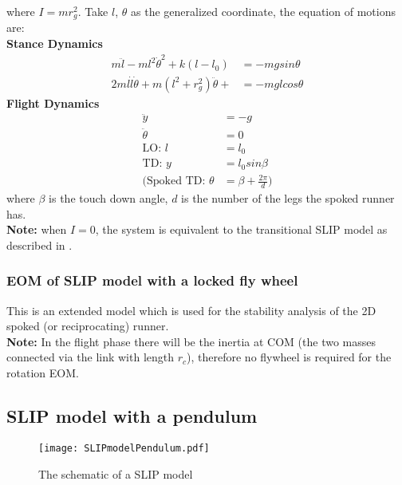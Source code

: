 \noindent
where $I = mr_g^2$. Take $l$, $\theta$ as the generalized coordinate, the equation of motions are:\\
\noindent
\textbf {Stance Dynamics}
\begin{align*}
m\ddot{l} - ml^2\dot{\theta}^2 + k(l-l_0) &= -mgsin\theta\\
2ml\dot l \dot{\theta} + m(l^2+r_g^2)\ddot{\theta} +   &= -mglcos\theta
\end{align*}
\noindent
\textbf {Flight Dynamics}
\begin{align*}
\ddot y &= -g\\
\ddot \theta &= 0\\
\text{LO: } l &= l_0\\
\text{TD: } y &= l_0sin\beta\\
\text{(Spoked TD: } \theta &= \beta + \frac{2\pi}{d}\text{)}
\end{align*}
where $\beta$ is the touch down angle, $d$ is the number of the legs the spoked runner has.\\
\textbf{Note:} when $I = 0$, the system is equivalent to the transitional SLIP model as described in  \cite{Shen2016}.



\subsubsection{EOM of SLIP model with a locked fly wheel}
This is an extended model which is used for the stability analysis of the 2D spoked (or reciprocating) runner.\\
\textbf{Note:} In the flight phase there will be the inertia at COM (the two masses connected via the link with length $r_c$), therefore no flywheel is required for the rotation EOM.


\subsection{SLIP model with a pendulum}
\begin{figure}[h]
\centering

\texttt{[image: SLIPmodelPendulum.pdf]}
\caption{The schematic of a SLIP model }
\label{fig.SLIPmodelPendulum}
\end{figure}

